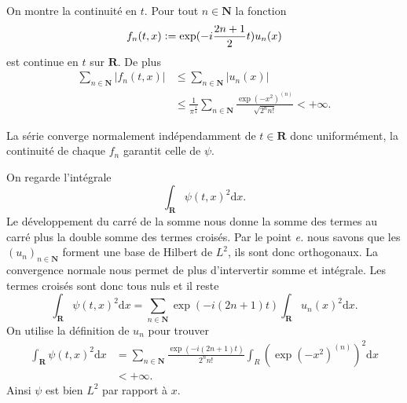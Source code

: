 \documentclass[12pt]{article}
\newcommand{\defeq}{\vcentcolon=}
\newcommand{\R}{\mathbf{R}}
\newcommand{\N}{\mathbf{N}}
\newcommand{\de}{\mathrm{d}}
\begin{document}
On montre la continuité en $t$. Pour tout $n \in \N$ la fonction \[
        f_n(t, x) \defeq \exp(-i\frac{2n+1}{2}t)u_n(x)
\] est continue en $t$ sur $\R$. De plus
\begin{align*}
        \sum_{n\in\N}|f_n(t, x)| &\le \sum_{n\in\N}|u_n(x)| \\
                                  &\le \frac{1}{\pi^{\frac{1}{4}}}\sum_{n\in\N}\frac{\exp(-x^2)^{(n)}}{\sqrt{2^{n}n!}} < +\infty
.\end{align*}

La série converge normalement indépendamment de $t \in \R$ donc uniformément, la continuité de chaque $f_n$ garantit celle de $\psi$. 

\medskip

On regarde l'intégrale \[
        \int_{\R}\psi(t, x)^{2}\de x
.\] Le développement du carré de la somme nous donne la somme des termes au carré plus la double somme des termes croisés. Par le point \textit{e.} nous savons que les $(u_n)_{n\in\N}$ forment une base de Hilbert de $L^2$, ils sont donc orthogonaux. La convergence normale nous permet de plus d'intervertir somme et intégrale. Les termes croisés sont donc tous nuls et il reste \[
\int_{\R}\psi(t, x)^{2}\de x = \sum_{n\in\N}\exp(-i(2n+1)t)\int_{\R}u_n(x)^{2}\de x
.\]  
On utilise la définition de $u_n$ pour trouver
\begin{align*}
        \int_{\R}\psi(t, x)^{2}\de x &= \sum_{n\in\N}\frac{\exp(-i(2n+1)t)}{2^{n}n!}\int_{R}(\exp(-x^{2})^{(n)})^{2}\de x \\
                                     &< +\infty
.\end{align*} Ainsi $\psi$ est bien $L^2$ par rapport à $x$.
\end{document}
